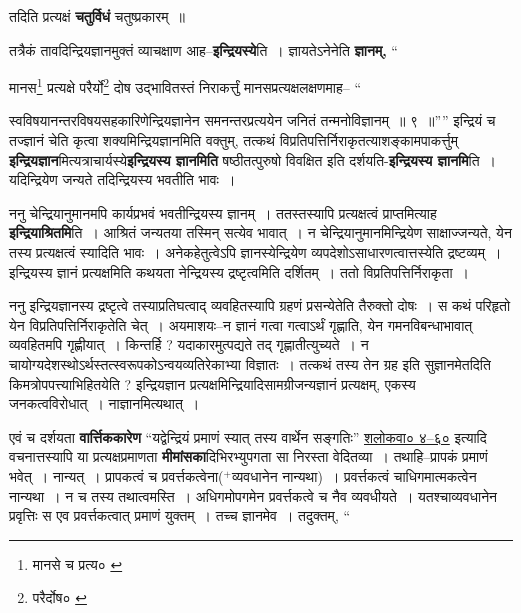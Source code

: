 \documentclass[article,12pt,a4paper]{memoir}
\newcommand{\add}[1]{($^{+}$#1)}
\begin{document}
	  \pstart तदिति प्रत्यक्षं \textbf{चतुर्विधं} चतुष्प्रकारम् ॥
	\pend
      

	  \pstart तत्रैकं तावदिन्द्रियज्ञानमुक्तं व्याचक्षाण आह--\textbf{इन्द्रियस्ये}ति । ज्ञायतेऽनेनेति \textbf{ज्ञानम्,}  \leavevmode{} “
	  
	मानस\footnote{मानसे च प्रत्य० \cite{dp-msB} \cite{dp-msD}} प्रत्यक्षे परैर्यो\footnote{परैर्दोष० \cite{dp-msD}} दोष उद्भावितस्तं निराकर्त्तुं मानसप्रत्यक्षलक्षणमाह-- “
	  
	स्वविषयानन्तरविषयसहकारिणेन्द्रियज्ञानेन समनन्तरप्रत्ययेन जनितं तन्मनोविज्ञानम् ॥ ९ ॥”” इन्द्रियं च तज्ज्ञानं चेति कृत्वा शक्यमिन्द्रियज्ञानमिति वक्तुम्, तत्कथं विप्रतिपत्तिर्निराकृतत्याशङ्कामपाकर्त्तुम् \textbf{इन्द्रियज्ञान}मित्यत्राचार्यस्ये\textbf{इन्द्रियस्य ज्ञानमिति} षष्ठीतत्पुरुषो विवक्षित इति दर्शयति-\textbf{इन्द्रियस्य ज्ञानमि}ति । यदिन्द्रियेण जन्यते तदिन्द्रियस्य भवतीति भावः ।
	\pend
      

	  \pstart ननु चेन्द्रियानुमानमपि कार्यप्रभवं भवतीन्द्रियस्य ज्ञानम् । ततस्तस्यापि प्रत्यक्षत्वं प्राप्तमित्याह \textbf{इन्द्रियाश्रितमि}ति । आश्रितं जन्यतया तस्मिन् सत्येव भावात् । न चेन्द्रियानु\leavevmode{}मानमिन्द्रियेण साक्षाज्जन्यते, येन तस्य प्रत्यक्षत्वं स्यादिति भावः । अनेकहेतुत्वेऽपि ज्ञानस्येन्द्रियेण व्यपदेशोऽसाधारणत्वात्तस्येति द्रष्टव्यम् । इन्द्रियस्य ज्ञानं प्रत्यक्षमिति कथयता नेन्द्रियस्य द्रष्टृत्वमिति दर्शितम् । ततो विप्रतिपत्तिर्निराकृता ।
	\pend
      

	  \pstart ननु इन्द्रियज्ञानस्य द्रष्टृत्वे तस्याप्रतिघत्वाद् व्यवहितस्यापि ग्रहणं प्रसन्येतेति तैरुक्तो दोषः । स कथं परिहृतो येन विप्रतिपत्तिर्निराकृतेति चेत् । अयमाशयः--न ज्ञानं गत्वा गत्वाऽर्थं गृह्णाति, येन गमनविबन्धाभावात् व्यवहितमपि गृह्णीयात् । किन्तर्हि ? यदाकारमुत्पद्यते तद् गृह्णातीत्युच्यते । न चायोग्यदेशस्थोऽर्थस्तत्स्वरूपकोऽन्वयव्यतिरेकाभ्या विज्ञातः । तत्कथं तस्य तेन ग्रह इति सुज्ञानमेतदिति किमत्रोपपत्त्याभिहितयेति ? इन्द्रियज्ञान प्रत्यक्षमिन्द्रियादिसामग्रीजन्यज्ञानं प्रत्यक्षम्, एकस्य जनकत्वविरोधात् । नाज्ञानमित्यथात् ।
	\pend
      

	  \pstart एवं च दर्शयता \textbf{वार्त्तिककारेण} “यद्वेन्द्रियं प्रमाणं स्यात् तस्य वार्थेन सङ्गतिः” \href{http://http://sarit.indology.info/?cref=śv.4.60}{शलोकवा०
	    ४--६०} इत्यादि वचनात्तस्यापि या प्रत्यक्षप्रमाणता \textbf{मीमांसका}दिभिरभ्युपगता सा निरस्ता वेदितव्या । तथाहि--प्रापकं प्रमाणं भवेत् । नान्यत् । प्रापकत्वं च प्रवर्त्तकत्वेना\add{व्यवधानेन नान्यथा} । प्रवर्त्तकत्वं चाधिगमात्मकत्वेन नान्यथा । न च तस्य तथात्वमस्ति । अधिगमोपगमेन प्रवर्त्तकत्वे च नैव व्यवधीयते । यतश्चाव्यवधानेन प्रवृत्तिः स एव प्रवर्त्तकत्वात् प्रमाणं युक्तम् । तच्च ज्ञानमेव । तदुक्तम्, “
	    \pend
	  
\end{document}

